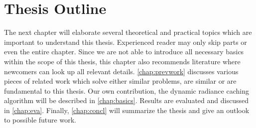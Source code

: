 \documentclass[thesis.tex]{subfiles}
\begin{document}


\section{Thesis Outline}
The next chapter will elaborate several theoretical and practical topics which are important to understand this thesis. %
Experienced reader may only skip parts or even the entire chapter.
Since we are not able to introduce all necessary basics within the scope of this thesis, this chapter also recommends literature where newcomers can look up all relevant details.
\autoref{chap:prevwork} discusses various pieces of related work which solve either similar problems, are similar or are fundamental to this thesis.
Our own contribution, the dynamic radiance caching algorithm will be described in \autoref{chap:basics}.
Results are evaluated and discussed in \autoref{chap:eva}.
Finally, \autoref{chap:concl} will summarize the thesis and give an outlook to possible future work.

\subfilebib %
\end{document}
